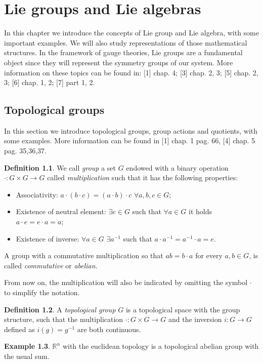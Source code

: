 \documentclass[12pt,a4paper]{report}
\theoremstyle{definition}
\newtheorem{Def}{Definition}[chapter]
\theoremstyle{Theorem}
\theoremstyle{definition}
\newtheorem{Ex}[Def]{Example}
\theoremstyle{definition}
\begin{document}
	\chapter{Lie groups and Lie algebras}
	In this chapter we introduce the concepts of Lie group and Lie algebra, with some important examples. We will also study representations of those mathematical structures. In the framework of gauge theories, Lie groups are a fundamental object since they will represent the symmetry groups of our system. More information on these topics can be found in:
	[1] chap. 4; [3] chap. 2, 3; [5] chap. 2, 3; [6] chap. 1, 2; [7] part 1, 2.
	\section{Topological groups}
	In this section we introduce topological groups, group actions and quotients, with some examples. More information can be found in [1] chap. 1 pag. 66, [4] chap. 5 pag. 35,36,37. 
	\begin{Def}
		We call \textit{group} a set $G$ endowed with a binary operation $\cdot:G\times G\rightarrow G$ called \textit{multiplication} such that it has the following properties:
		\begin{itemize}
			\item Associativity: $a\cdot (b\cdot c)=(a\cdot b)\cdot c$ $\forall a,b,c\in G$;
			\item Existence of neutral element: $\exists e\in G$ such that $\forall a\in G$ it holds $a\cdot e=e\cdot a=a$;
			\item Existence of inverse: $\forall a\in G$ $\exists a^{-1}$ such that $a\cdot a^{-1}=a^{-1}\cdot a=e$.
		\end{itemize}
		A group with a commutative multiplication so that $ab= b\cdot a$ for every $a,b\in G$, is called \textit{commutative} or \textit{abelian}.
	\end{Def}
	From now on, the multiplication will also be indicated by omitting the symbol $\cdot$ to simplify the notation.
	\begin{Def}
		A \textit{topological group} $G$ is a topological space with the group structure, such that the multiplication $\cdot:G\times G\rightarrow G$ and the inversion $i:G\rightarrow G$ defined as $i(g)=g^{-1}$ are both continuous.
	\end{Def}
	\begin{Ex}
		$\mathbb{R}^n$ with the euclidean topology is a topological abelian group with the usual sum.
	\end{Ex}
\end{document}
